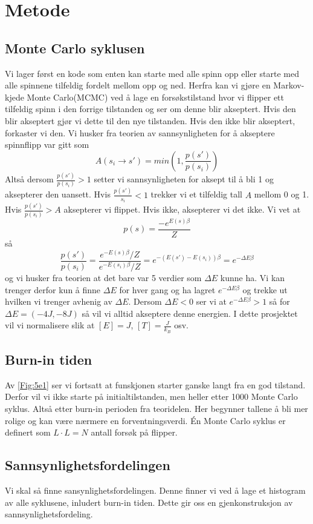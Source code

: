 \documentclass[reprint,english,notitlepage]{revtex4-2}  %
\begin{document}
\section{Metode}
\subsection{Monte Carlo syklusen}
Vi lager først en kode som enten kan starte med alle spinn opp eller starte med alle spinnene tilfeldig fordelt mellom opp og ned. Herfra kan vi gjøre en Markov-kjede Monte Carlo(MCMC) ved å lage en forsøkstilstand hvor vi flipper ett tilfeldig spinn i den forrige tilstanden og ser om denne blir akseptert. Hvis den blir akseptert gjør vi dette til den nye tilstanden. Hvis den ikke blir akseptert, forkaster vi den. Vi husker fra teorien av sannsynligheten for å akseptere spinnflipp var gitt som
$$
A(s_i\rightarrow s')=min(1, \frac{p(s')}{p(s_i)})
$$
Altså dersom $\frac{p(s')}{p(s_i)}>1$ setter vi sannsynligheten for aksept til å bli 1 og aksepterer den uansett. Hvis $\frac{p(s')}{s_i}<1$ trekker vi et tilfeldig tall $A$ mellom 0 og 1. Hvis $\frac{p(s')}{p(s_i)}>A$ aksepterer vi flippet. Hvis ikke, aksepterer vi det ikke. Vi vet at
$$
p(s)=\frac{-e^{E(s)\beta}}{Z}
$$
så
$$
\frac{p(s')}{p(s_i)}=\frac{e^{-E(s)\beta}/Z}{e^{-E(s_i)\beta}/Z}=e^{-(E(s')-E(s_i))\beta}=e^{-\Delta E \beta}
$$
og vi husker fra teorien at det bare var 5 verdier som $\Delta E$ kunne ha. Vi kan trenger derfor kun å finne $\Delta E$ for hver gang og ha lagret $e^{-\Delta E \beta}$ og trekke ut hvilken vi trenger avhenig av $\Delta E$. Dersom $\Delta E<0$ ser vi at $e^{-\Delta E \beta}>1$ så for $\Delta E=(-4J, -8J)$ så vil vi alltid akseptere denne energien. I dette prosjektet vil vi normalisere slik at $[E]=J$, $[T]=\frac{J}{k_B}$ osv.
\subsection{Burn-in tiden}
Av \autoref{Fig:5e1} ser vi fortsatt at funskjonen starter ganske langt fra en god tilstand. Derfor vil vi ikke starte på initialtilstanden, men heller etter 1000 Monte Carlo syklus. Altså etter burn-in perioden fra teoridelen. Her begynner tallene å bli mer rolige og kan være nærmere en forventningsverdi. Én Monte Carlo syklus er definert som $L\cdot L=N$ antall forsøk på flipper.
\subsection{Sannsynlighetsfordelingen}
Vi skal så finne sansynlighetsfordelingen. Denne finner vi ved å lage et histogram av alle syklusene, inludert burn-in tiden. Dette gir oss en gjenkonstruksjon av sannsynlighetsfordeling.
\end{document}
